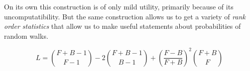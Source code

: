 On its own this construction is of only mild utility, primarily because of its uncomputatibility. But the same construction allows us to get a variety of \emph{rank order statistics} that allow us to make useful statements about probabilities of random walks.

\begin{equation}
L = \binom{F+B-1}{F-1} - 2\binom{F+B-1}{B-1} + \left(\frac{F-B}{F+B}\right)^2\binom{F+B}{F}
\end{equation}
